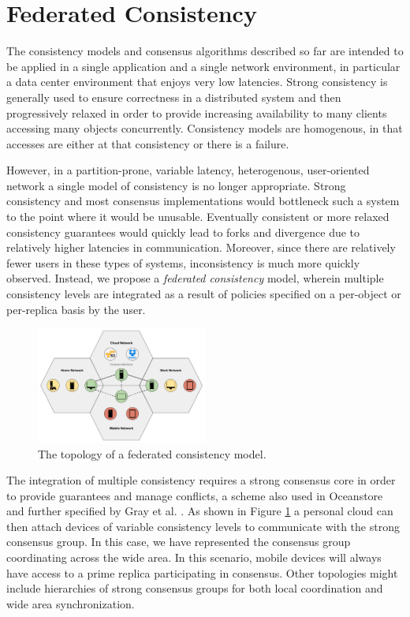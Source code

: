 \documentclass[letterpaper,twocolumn,10pt]{article}
\begin{document}
\section{Federated Consistency}

The consistency models and consensus algorithms described so far are intended to be applied in a single application and a single network environment, in particular a data center environment that enjoys very low latencies. Strong consistency is generally used to ensure correctness in a distributed system and then progressively relaxed in order to provide increasing availability to many clients accessing many objects concurrently. Consistency models are homogenous, in that accesses are either at that consistency or there is a failure.

However, in a partition-prone, variable latency, heterogenous, user-oriented network a single model of consistency is no longer appropriate. Strong consistency and most consensus implementations would bottleneck such a system to the point where it would be unusable. Eventually consistent or more relaxed consistency guarantees would quickly lead to forks and divergence due to relatively higher latencies in communication. Moreover, since there are relatively fewer users in these types of systems, inconsistency is much more quickly observed. Instead, we propose a \textit{federated consistency} model, wherein multiple consistency levels are integrated as a result of policies specified on a per-object or per-replica basis by the user.

\begin{figure}[h]
    \centering
    \includegraphics[width=0.5\textwidth]{figures/topology}
    \caption{The topology of a federated consistency model.}
    \label{fig:topology}
\end{figure}

The integration of multiple consistency requires a strong consensus core in order to provide guarantees and manage conflicts, a scheme also used in Oceanstore \cite{kubiatowicz_oceanstore_2000} and further specified by Gray et al. \cite{gray_dangers_1996}. As shown in Figure \ref{fig:topology} a personal cloud can then attach devices of variable consistency levels to communicate with the strong consensus group. In this case, we have represented the consensus group coordinating across the wide area. In this scenario, mobile devices will always have access to a prime replica participating in consensus. Other topologies might include hierarchies of strong consensus groups for both local coordination and wide area synchronization.
\end{document}
